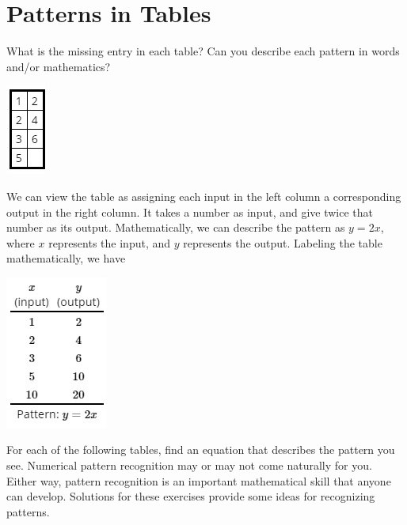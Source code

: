 \documentclass{ximera}
\begin{document}
\section{Patterns in Tables}
\begin{example}
What is the missing entry in each table? Can you describe each pattern in words and/or mathematics?

\includegraphics{2-2table1.jpg}

 \begin{explanation}
We can view the table as assigning each input in the left column a corresponding output in the right column. It takes a number as input, and give twice that number as its output. Mathematically, we can describe the pattern as $y=2x$, where $x$  represents the input, and $y$ represents the output. Labeling the table mathematically, we have

\includegraphics{2-2table1.2.jpg}

\end{explanation}
\end{example}

For each of the following tables, find an equation that describes the pattern you see. Numerical pattern recognition may or may not come naturally for you. Either way, pattern recognition is an important mathematical skill that anyone can develop. Solutions for these exercises provide some ideas for recognizing patterns.
\end{document}
